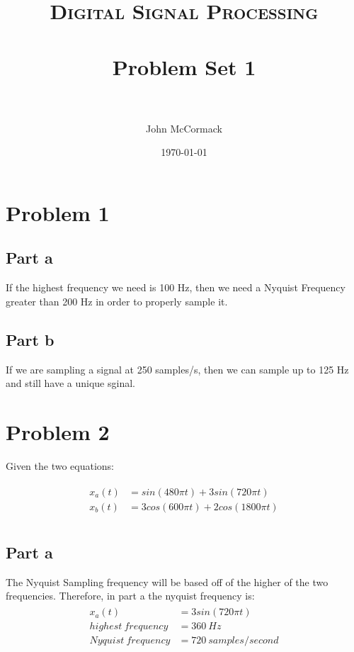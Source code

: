 \documentclass[paper=letterpaper, fontsize=11pt]{scrartcl} %
\title{	
\normalfont \normalsize 
\textsc{Digital Signal Processing} \\ [25pt] %
\horrule{0.5pt} \\[0.4cm] %
\huge Problem Set 1 \\ %
\horrule{2pt} \\[0.5cm] %
}
\author{John McCormack} %
\date{\normalsize\today} %
\numberwithin{equation}{section} %
\numberwithin{figure}{section} %
\numberwithin{table}{section} %
\begin{document}
\maketitle %


\section{Problem 1}

\subsection{Part a}
	If the highest frequency we need is 100 Hz, then we need a Nyquist Frequency
	greater than 200 Hz in order to properly sample it.

\subsection{Part b}
	If we are sampling a signal at 250 samples/s, then we can sample 
	up to 125 Hz and still have a unique sginal. 

\section{Problem 2}

Given the two equations:

\begin{align} 
\begin{split}
	x_{a}(t)	&= sin(480 \pi t) + 3sin(720 \pi t) \\
	x_{b}(t)	&= 3cos(600 \pi t) + 2cos(1800 \pi t)\\
\end{split}					
\end{align}

\subsection{Part a}
	The Nyquist Sampling frequency will be based off of the higher of the two frequencies. 
	Therefore, in part a the nyquist frequency is:
	\begin{align}
	\begin{split}
		x_{a}(t)	&= 3sin(720 \pi t)\\
		highest \: frequency  &= 360 \: Hz\\
		Nyquist \: frequency &= 720 \: samples/second\\
	\end{split}
	\end{align}
\end{document}
